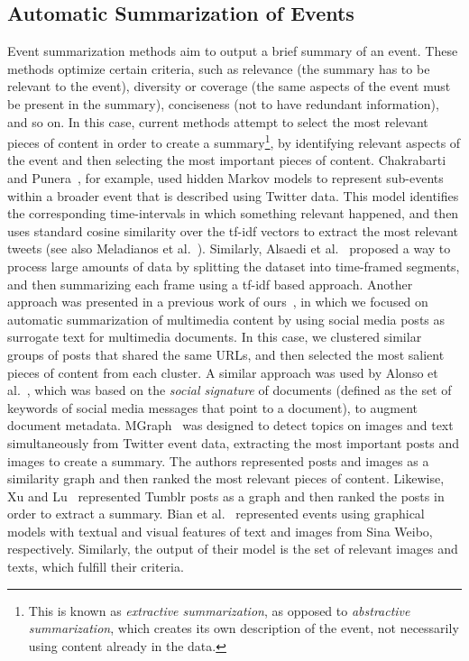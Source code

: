 \subsection{Automatic Summarization of Events} 
%
Event summarization methods aim to output a brief summary of an event.
%
These methods optimize certain criteria, such as relevance (the summary has to
be relevant to the event), diversity or coverage (the same aspects of the event
must be present in the summary), conciseness (not to have redundant information), 
and so on.
%
In this case, current methods attempt to select the most relevant pieces of
content in order to create a summary\footnote{This is known as {\em extractive
summarization}, as opposed to {\em abstractive summarization}, which creates its
own description of the event, not necessarily using content already in the
data.}, by identifying relevant aspects of the event and then selecting the most
important pieces of content.
%
Chakrabarti and Punera~\cite{chakrabarti2011event}, for example, used hidden
Markov models to represent sub-events within a broader event that is described
using Twitter data. 
%
This model identifies the corresponding time-intervals in which something
relevant happened, and then uses standard cosine similarity over the tf-idf
vectors to extract the most relevant tweets (see also Meladianos et
al.~\cite{meladianos2018optimization}).
%
Similarly, Alsaedi et al.~\cite{alsaedi2016temporal} proposed a way to process
large amounts of data by splitting the dataset into time-framed segments, and
then summarizing each frame using a tf-idf based approach.
%
Another approach was presented in a previous work of
ours~\cite{quezada2013understanding}, in which we focused on automatic
summarization of multimedia content by using social media posts as surrogate
text for multimedia documents.
%
In this case, we clustered similar groups of posts that shared the same URLs,
and then selected the most salient pieces of content from each cluster.
%
A similar approach was used by Alonso et
al.~\cite{Alonso:2015:WCW:2740908.2745397}, which was based on the \emph{social
signature} of documents (defined as the set of keywords of social media messages
that point to a document), to augment document metadata.
%
MGraph~\cite{schinas2016mgraph} was designed to detect topics on images and text
simultaneously from Twitter event data, extracting the most important posts
and images to create a summary.
%
The authors represented posts and images as a similarity graph and then ranked
the most relevant pieces of content.
%
Likewise, Xu and Lu~\cite{Xu:2015:SBP:2678025.2701385} represented Tumblr posts
as a graph and then ranked the posts in order to extract a summary.
%
Bian et al.~\cite{bian2014multimedia} represented events using graphical models
with textual and visual features of text and images from Sina Weibo,
respectively.
%
Similarly, the output of their model is the set of relevant images and texts,
which fulfill their criteria.

